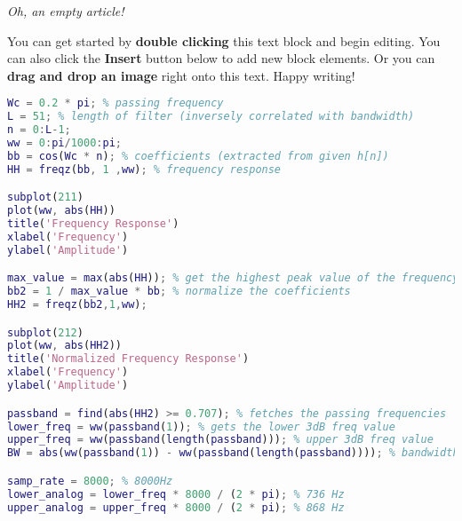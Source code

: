 \textit{Oh, an empty article!} 

You can get started by \textbf{double clicking} this text block and begin editing. You can also click the \textbf{Insert} button below to add new block elements. Or you can \textbf{drag and drop an image} right onto this text. Happy writing!

\begin{lstlisting}[language=Matlab]
Wc = 0.2 * pi; % passing frequency
L = 51; % length of filter (inversely correlated with bandwidth)
n = 0:L-1;
ww = 0:pi/1000:pi;
bb = cos(Wc * n); % coefficients (extracted from given h[n])
HH = freqz(bb, 1 ,ww); % frequency response

subplot(211)
plot(ww, abs(HH))
title('Frequency Response')
xlabel('Frequency')
ylabel('Amplitude')

max_value = max(abs(HH)); % get the highest peak value of the frequency response
bb2 = 1 / max_value * bb; % normalize the coefficients
HH2 = freqz(bb2,1,ww);

subplot(212)
plot(ww, abs(HH2))
title('Normalized Frequency Response')
xlabel('Frequency')
ylabel('Amplitude')

passband = find(abs(HH2) >= 0.707); % fetches the passing frequencies
lower_freq = ww(passband(1)); % gets the lower 3dB freq value
upper_freq = ww(passband(length(passband))); % upper 3dB freq value
BW = abs(ww(passband(1)) - ww(passband(length(passband)))); % bandwidth

samp_rate = 8000; % 8000Hz
lower_analog = lower_freq * 8000 / (2 * pi); % 736 Hz
upper_analog = upper_freq * 8000 / (2 * pi); % 868 Hz
\end{lstlisting}